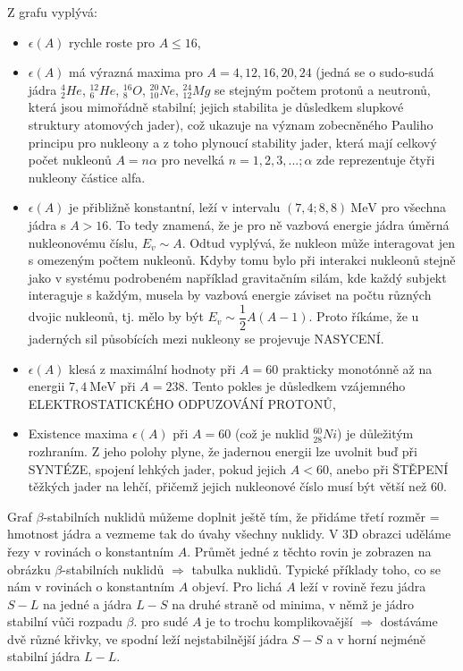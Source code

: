 \documentclass[../../main.tex]{subfiles}
\begin{document}
Z grafu vyplývá:
\begin{itemize}
	\item $\epsilon (A)$ rychle roste pro $A \leq 16$,
	\item $\epsilon (A)$ má výrazná maxima pro $A = 4, 12, 16, 20, 24$ (jedná se o sudo-sudá jádra $^{4}_{2}He$, $^{12}_{6}He$, $^{16}_{8}O$, $^{20}_{10}Ne$, $^{24}_{12}Mg$ se stejným počtem protonů a neutronů, která jsou mimořádně stabilní; jejich stabilita je důsledkem slupkové struktury atomových jader), což ukazuje na význam zobecněného Pauliho principu pro nukleony a z toho plynoucí stability jader, která mají celkový počet nukleonů $A= n \alpha$ pro nevelká $n = 1, 2, 3, ...; \alpha$ zde reprezentuje čtyři nukleony částice alfa. 
	\item $\epsilon (A)$ je přibližně konstantní, leží v intervalu $(7,4; 8,8) ~\mathrm{MeV}$ pro všechna jádra s $A > 16$. To tedy znamená, že je pro ně vazbová energie jádra úměrná nukleonovému číslu, $E_v \sim A$. Odtud vyplývá, že nukleon může interagovat jen s omezeným počtem nukleonů. Kdyby tomu bylo při interakci nukleonů stejně jako v systému podrobeném například gravitačním silám, kde každý subjekt interaguje s každým, musela by vazbová energie záviset na počtu různých dvojic nukleonů, tj. mělo by být $E_v \sim \dfrac{1}{2} A(A-1) $. Proto říkáme, že u jaderných sil působících mezi nukleony se projevuje NASYCENÍ. 
	\item $\epsilon (A)$ klesá z maximální hodnoty při $A = 60$ prakticky monotónně až na energii $7,4 ~\mathrm{MeV}$ při $A=238$. Tento pokles je důsledkem vzájemného ELEKTROSTATICKÉHO ODPUZOVÁNÍ PROTONŮ,
	\item Existence maxima $\epsilon (A) $ při $A=60$ (což je nuklid $^{60}_{28}Ni$) je důležitým rozhraním. Z jeho polohy plyne, že jadernou energii lze uvolnit buď při SYNTÉZE, spojení lehkých jader, pokud jejich $A < 60$, anebo při ŠTĚPENÍ těžkých jader na lehčí, přičemž jejich nukleonové číslo musí být větší než 60.
\end{itemize}

Graf $\beta$-stabilních nuklidů můžeme doplnit ještě tím, že přidáme třetí rozměr = hmotnost jádra a vezmeme tak do úvahy všechny nuklidy. V 3D obrazci uděláme řezy v rovinách o konstantním $A$. Průmět jedné z těchto rovin je zobrazen na obrázku $\beta$-stabilních nuklidů $\Rightarrow$ tabulka nuklidů. Typické příklady toho, co se nám v rovinách o konstantním $A$ objeví. Pro lichá $A$ leží v rovině řezu jádra $S-L$ na jedné a jádra $L-S$ na druhé straně od minima, v němž je jádro stabilní vůči rozpadu $\beta$. pro sudé $A$ je to trochu komplikovaější $\Rightarrow$ dostáváme dvě různé křivky, ve spodní leží nejstabilnější jádra $S-S$ a v horní nejméně stabilní jádra $L-L$. 
\end{document}
